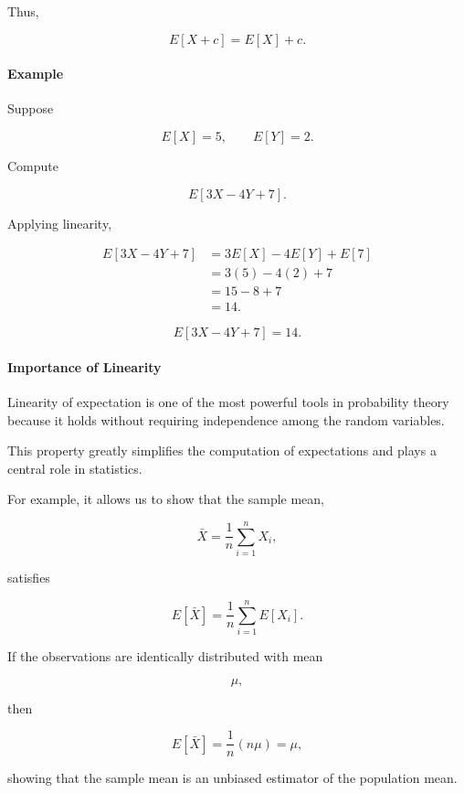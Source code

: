 \documentclass[11pt]{article}
\begin{document}
\begin{mdframed}[
		linewidth=0.8pt,
		roundcorner=6pt,
		backgroundcolor=gray!5,
		linecolor=gray!60,
		innertopmargin=10pt,
		innerbottommargin=10pt,
		innerleftmargin=10pt,
		innerrightmargin=10pt
		]
		Thus,
		
		\[
		\boxed{
			E[X+c]
			=
			E[X]
			+
			c.
		}
		\]
		
		\bigskip
		
		\paragraph{Example}
		
		Suppose
		
		\[
		E[X]=5,
		\qquad
		E[Y]=2.
		\]
		
		Compute
		
		\[
		E[3X-4Y+7].
		\]
		
		Applying linearity,
		
		\[
		\begin{aligned}
			E[3X-4Y+7]
			&=
			3E[X]
			-
			4E[Y]
			+
			E[7]
			\\[0.3cm]
			&=
			3(5)
			-
			4(2)
			+
			7
			\\[0.3cm]
			&=
			15
			-
			8
			+
			7
			\\[0.3cm]
			&=
			14.
		\end{aligned}
		\]
		
		\[
		\boxed{
			E[3X-4Y+7]=14.
		}
		\]
		
		\bigskip
		
		\paragraph{Importance of Linearity}
		
		Linearity of expectation is one of the most powerful tools in probability
		theory because it holds without requiring independence among the random
		variables.
		
		This property greatly simplifies the computation of expectations and plays
		a central role in statistics.
		
		For example, it allows us to show that the sample mean,
		
		\[
		\bar X
		=
		\frac1n
		\sum_{i=1}^{n}
		X_i,
		\]
		
		satisfies
		
		\[
		E[\bar X]
		=
		\frac1n
		\sum_{i=1}^{n}
		E[X_i].
		\]
		
		If the observations are identically distributed with mean
		
		\[
		\mu,
		\]
		
		then
		
		\[
		E[\bar X]
		=
		\frac1n(n\mu)
		=
		\mu,
		\]
		
		showing that the sample mean is an unbiased estimator of the population
		mean.
		
	\end{mdframed}
	
\end{document}
